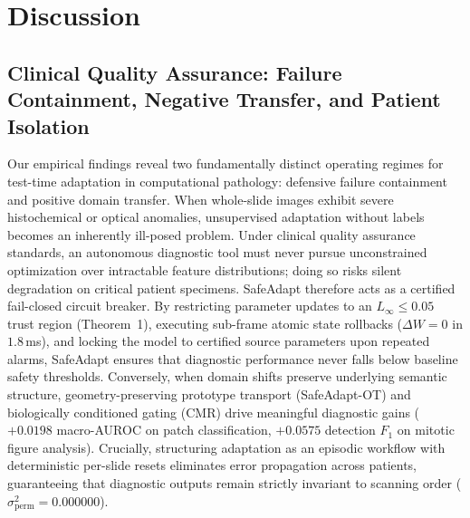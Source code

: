 \documentclass[journal]{IEEEtran}
\begin{document}
\begin{table}[t]
\centering
\caption{Clinical Nottingham Histological Mitotic Grade Concordance Across 50 Cases on Scanner 3 (Mean over 3 Seeds).}
\label{tab:nottingham}
\scriptsize
\renewcommand{\arraystretch}{0.92}
\setlength{\tabcolsep}{3.5pt}
\end{table}

\section{Discussion}
\subsection{Clinical Quality Assurance: Failure Containment, Negative Transfer, and Patient Isolation}
Our empirical findings reveal two fundamentally distinct operating regimes for test-time adaptation in computational pathology: defensive failure containment and positive domain transfer. When whole-slide images exhibit severe histochemical or optical anomalies, unsupervised adaptation without labels becomes an inherently ill-posed problem. Under clinical quality assurance standards, an autonomous diagnostic tool must never pursue unconstrained optimization over intractable feature distributions; doing so risks silent degradation on critical patient specimens. SafeAdapt therefore acts as a certified fail-closed circuit breaker. By restricting parameter updates to an $L_\infty \le 0.05$ trust region (Theorem~1), executing sub-frame atomic state rollbacks ($\Delta W = 0$ in $1.8$\,ms), and locking the model to certified source parameters upon repeated alarms, SafeAdapt ensures that diagnostic performance never falls below baseline safety thresholds. Conversely, when domain shifts preserve underlying semantic structure, geometry-preserving prototype transport (SafeAdapt-OT) and biologically conditioned gating (CMR) drive meaningful diagnostic gains ($+0.0198$ macro-AUROC on patch classification, $+0.0575$ detection $F_1$ on mitotic figure analysis). Crucially, structuring adaptation as an episodic workflow with deterministic per-slide resets eliminates error propagation across patients, guaranteeing that diagnostic outputs remain strictly invariant to scanning order ($\sigma^2_{\mathrm{perm}} = 0.000000$).
\end{document}
